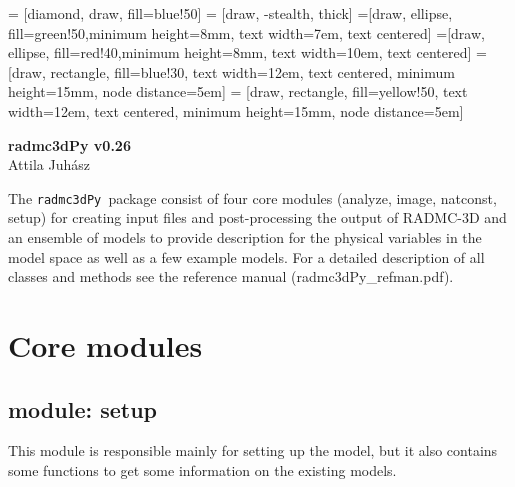 \documentclass[12pt]{article}
\newcommand{\pymod}{{\tt  radmc3dPy }}
\begin{document}
 = [diamond, draw, fill=blue!50]
 = [draw, -stealth, thick]
=[draw, ellipse, fill=green!50,minimum height=8mm, text width=7em, text centered]
=[draw, ellipse, fill=red!40,minimum height=8mm, text width=10em, text centered]
 = [draw, rectangle, fill=blue!30, text width=12em, text centered, minimum height=15mm, node distance=5em]
 = [draw, rectangle, fill=yellow!50, text width=12em, text centered, minimum height=15mm, node distance=5em]



\begin{center}
{\huge\bf radmc3dPy v0.26}\\
\vspace{0.5cm}
{\large Attila Juh\'asz}
\end{center}
The \pymod package consist of four core modules (analyze, image, natconst, setup)  for creating input files and post-processing
the output of RADMC-3D and an ensemble of models to provide description for the physical variables in the model space as well
as a few example models. For a detailed description of all classes and methods see the reference manual (radmc3dPy\_refman.pdf).

\section{Core modules}
\label{sec:core}

\subsection{module: setup}
\label{subsec:setup}

This module is responsible mainly for setting up the model, but it also contains some functions to get some information on the
existing models. 
\end{document}
